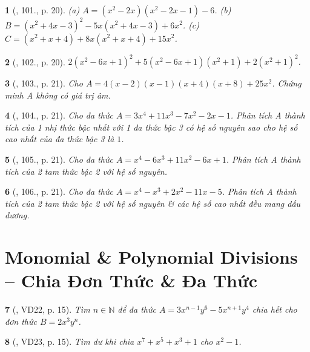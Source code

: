 \documentclass{article}
\newtheorem{baitoan}{}
\begin{document}
\begin{baitoan}[\cite{Tuyen_Toan_8}, 101., p. 20]
	(a) $A = (x^2 - 2x)(x^2 - 2x - 1) - 6$. (b) $B = (x^2 + 4x - 3)^2 - 5x(x^2 + 4x - 3) + 6x^2$. (c) $C = (x^2 + x + 4) + 8x(x^2 + x + 4) + 15x^2$.
\end{baitoan}

\begin{baitoan}[\cite{Tuyen_Toan_8}, 102., p. 20]
	$2(x^2 - 6x + 1)^2 + 5(x^2 - 6x + 1)(x^2 + 1) + 2(x^2 + 1)^2$.
\end{baitoan}

\begin{baitoan}[\cite{Tuyen_Toan_8}, 103., p. 21]
	Cho $A = 4(x - 2)(x - 1)(x + 4)(x + 8) + 25x^2$. Chứng minh A không có giá trị âm.
\end{baitoan}

\begin{baitoan}[\cite{Tuyen_Toan_8}, 104., p. 21]
	Cho đa thức $A = 3x^4 + 11x^3 - 7x^2 - 2x - 1$. Phân tích A thành tích của 1 nhị thức bậc nhất với 1 đa thức bậc 3 có hệ số nguyên sao cho hệ số cao nhất của đa thức bậc 3 là $1$. 
\end{baitoan}

\begin{baitoan}[\cite{Tuyen_Toan_8}, 105., p. 21]
	Cho đa thức $A = x^4 - 6x^3 + 11x^2 - 6x + 1$. Phân tích A thành tích của 2 tam thức bậc 2 với hệ số nguyên.
\end{baitoan}

\begin{baitoan}[\cite{Tuyen_Toan_8}, 106., p. 21]
	Cho đa thức $A = x^4 - x^3 + 2x^2 - 11x - 5$. Phân tích A thành tích của 2 tam thức bậc 2 với hệ số nguyên \& các hệ số cao nhất đều mang dấu dương.
\end{baitoan}


\section{Monomial \& Polynomial Divisions -- Chia Đơn Thức \& Đa Thức}

\begin{baitoan}[\cite{Binh_Toan_8_tap_1}, VD22, p. 15]
	Tìm $n\in\mathbb{N}$ để đa thức $A = 3x^{n-1}y^6 - 5x^{n+1}y^4$ chia hết cho đơn thức $B = 2x^3y^n$.	
\end{baitoan}

\begin{baitoan}[\cite{Binh_Toan_8_tap_1}, VD23, p. 15]
	Tìm dư khi chia $x^7 + x^5 + x^3 + 1$ cho $x^2 - 1$.
\end{baitoan}
\end{document}

